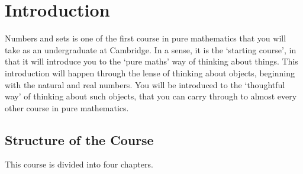 \documentclass[a4]{scrartcl}
\begin{document}




\tableofcontents

\clearpage
\section{Introduction}

Numbers and sets is one of the first course in pure mathematics that you will take
as an undergraduate at Cambridge. In a sense, it is the `starting course', in that it will introduce you to the `pure maths' way of thinking about things. 
This introduction will happen through the lense of thinking about objects, beginning with the natural and real numbers. You will be introduced to the `thoughtful way' of thinking about such objects, that you can carry through to almost every other course in pure mathematics.

\subsection{Structure of the Course}

This course is divided into four chapters.
\end{document}
